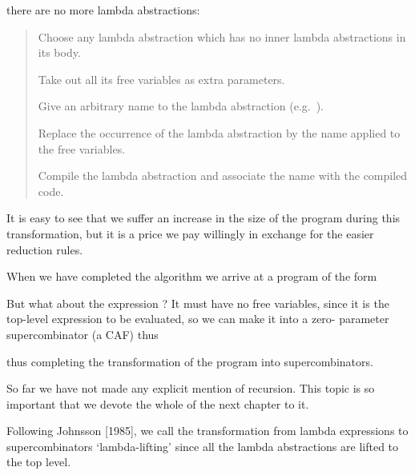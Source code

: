 there are no more lambda abstractions:
\begin{quote}
    \vspace{-0.5\baselineskip}
    \begin{compactenum}[(1)]
        \item Choose any lambda abstraction which has no inner lambda
        abstractions in its body.
        \item Take out all its free variables as extra parameters.
        \item Give an arbitrary name to the lambda abstraction (e.g.\ ).
        \item Replace the occurrence of the lambda abstraction by the name
        applied to the free variables.
        \item Compile the lambda abstraction and associate the name with the
        compiled code.
    \end{compactenum}
    \vspace{-0.5\baselineskip}
\end{quote}

\vs

\noindent It is easy to see that we suffer an increase in the size of the program during this
transformation, but it is a price we pay willingly in exchange for the easier
reduction rules.

When we have completed the algorithm we arrive at a program of the form


But what about the expression ? It must have no free variables, since it is
the top-level expression to be evaluated, so we can make it into a zero-
parameter supercombinator (a CAF) thus


\noindent
thus completing the transformation of the program into supercombinators.

So far we have not made any explicit mention of recursion. This topic is so
important that we devote the whole of the next chapter to it.

Following Johnsson [1985], we call the transformation from lambda
expressions to supercombinators `lambda-lifting' since all the lambda
abstractions are lifted to the top level.

